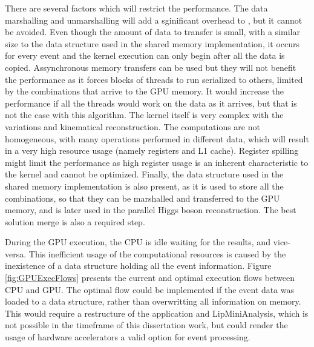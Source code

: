 There are several factors which will restrict the performance. The data marshalling and unmarshalling will add a sginificant overhead to \ttDilepKinFit, but it cannot be avoided. Even though the amount of data to transfer is small, with a similar size to the data structure used in the shared memory implementation, it occurs for every event and the kernel execution can only begin after all the data is copied. Assynchronous memory transfers can be used but they will not benefit the performance as it forces blocks of threads to run serialized to others, limited by the combinations that arrive to the GPU memory. It would increase the performance if all the threads would work on the data as it arrives, but that is not the case with this algorithm. The kernel itself is very complex with the variations and kinematical reconstruction. The computations are not homogeneous, with many operations performed in different data, which will result in a very high resource usage (namely registers and L1 cache). Register spilling might limit the performance as high register usage is an inherent characteristic to the kernel and cannot be optimized. Finally, the data structure used in the shared memory implementation is also present, as it is used to store all the combinations, so that they can be marshalled and transferred to the GPU memory, and is later used in the parallel Higgs boson reconstruction. The best solution merge is also a required step.

During the GPU execution, the CPU is idle waiting for the results, and vice-versa. This inefficient usage of the computational resources is caused by the inexistence of a data structure holding all the event information. Figure \ref{fig:GPUExecFlows} presents the current and optimal execution flows between CPU and GPU. The optimal flow could be implemented if the event data was loaded to a data structure, rather than overwritting all information on memory. This would require a restructure of the application and LipMiniAnalysis, which is not possible in the timeframe of this dissertation work, but could render the usage of hardware accelerators a valid option for event processing.


